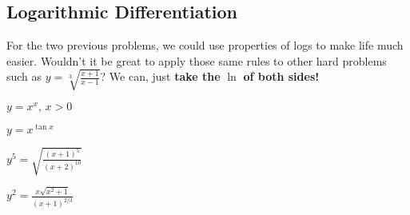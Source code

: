 \subsection*{Logarithmic Differentiation}
For the two previous problems, we could use properties of logs to make life much easier. Wouldn't it be great to apply those same rules to other hard problems such as $\displaystyle y=\sqrt[3]{\frac{x+1}{x-1}}$? We can, just \textbf{take the }$\ln$\textbf{ of both sides!}
\begin{questions}
    \question $\displaystyle y=x^x,\, x>0$
    
    
    \question $y=x^{\tan x}$
    
    
    \question $\displaystyle y^5=\sqrt{\frac{(x+1)^5}{(x+2)^{10}}}$
    
    
    \question $\displaystyle y^2=\frac{x\sqrt{x^2+1}}{(x+1)^{2/3}}$
    
\end{questions}




\newpage
